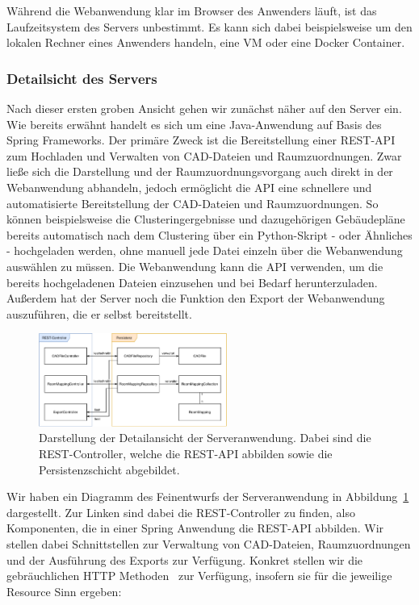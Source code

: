 Während die Webanwendung klar im Browser des Anwenders läuft, ist das Laufzeitsystem des Servers unbestimmt.
Es kann sich dabei beispielsweise um den lokalen Rechner eines Anwenders handeln, eine VM oder eine Docker Container.

\subsubsection{Detailsicht des Servers}
\label{subsubsec:detail-server}

Nach dieser ersten groben Ansicht gehen wir zunächst näher auf den Server ein.
Wie bereits erwähnt handelt es sich um eine Java-Anwendung auf Basis des Spring Frameworks.
Der primäre Zweck ist die Bereitstellung einer REST-API zum Hochladen und Verwalten von CAD-Dateien und Raumzuordnungen.
Zwar ließe sich die Darstellung und der Raumzuordnungsvorgang auch direkt in der Webanwendung abhandeln, jedoch ermöglicht die API eine schnellere und automatisierte Bereitstellung der CAD-Dateien und Raumzuordnungen.
So können beispielsweise die Clusteringergebnisse und dazugehörigen Gebäudepläne bereits automatisch nach dem Clustering über ein Python-Skript - oder Ähnliches - hochgeladen werden, ohne manuell jede Datei einzeln über die Webanwendung auswählen zu müssen.
Die Webanwendung kann die API verwenden, um die bereits hochgeladenen Dateien einzusehen und bei Bedarf herunterzuladen.
Außerdem hat der Server noch die Funktion den Export der Webanwendung auszuführen, die er selbst bereitstellt.

\begin{figure}[h]
    \includegraphics[width=0.55\textwidth]{res/server-architecture.pdf}
    \caption{Darstellung der Detailansicht der Serveranwendung.
    Dabei sind die REST-Controller, welche die REST-API abbilden sowie die Persistenzschicht abgebildet.}
    \label{fig:detail-view-server}
\end{figure}

Wir haben ein Diagramm des Feinentwurfs der Serveranwendung in Abbildung~\ref{fig:detail-view-server} dargestellt.
Zur Linken sind dabei die REST-Controller zu finden, also Komponenten, die in einer Spring Anwendung die REST-API abbilden.
Wir stellen dabei Schnittstellen zur Verwaltung von CAD-Dateien, Raumzuordnungen und der Ausführung des Exports zur Verfügung.
Konkret stellen wir die gebräuchlichen HTTP Methoden~\cite{MozillaHTTPMethods} zur Verfügung, insofern sie für die jeweilige Resource Sinn ergeben:

